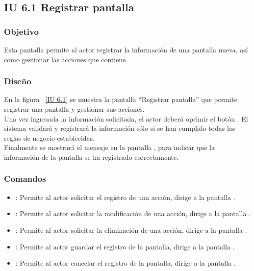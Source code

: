 \subsection{IU 6.1 Registrar pantalla}

\subsubsection{Objetivo}
	
	Esta pantalla permite al actor registrar la información de una pantalla nueva, así como gestionar las acciones que contiene.

\subsubsection{Diseño}

    En la figura ~\ref{IU 6.1} se muestra la pantalla ``Registrar pantalla'' que permite registrar una pantalla y gestionar sus acciones. \\
    
    Una vez ingresada la información solicitada, el actor deberá oprimir el botón . El sistema validará y registrará la 
    información sólo si se han cumplido todas las reglas de negocio establecidas.  \\
    
    Finalmente se mostrará el mensaje  en la pantalla , 
    para indicar que la información de la pantalla
    se ha registrado correctamente.        



\subsubsection{Comandos}
\begin{itemize}
	\item {}: Permite al actor solicitar el registro de una acción, dirige a la pantalla .
	\item \btnEditar[Modificar]: Permite al actor solicitar la modificación de una acción, dirige a la pantalla .
	\item \btnEliminar[Eliminar]: Permite al actor solicitar la eliminación de una acción, dirige a la pantalla .
	\item {}: Permite al actor guardar el registro de la pantalla, dirige a la pantalla .
	\item {}: Permite al actor cancelar el registro de la pantalla, dirige a la pantalla .
\end{itemize}


